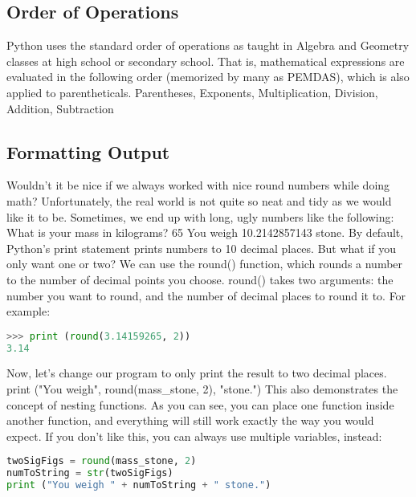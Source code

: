 \subsection{Order of Operations}
 Python uses the standard order of operations as taught in Algebra and Geometry
classes at high school or secondary school. That is, mathematical expressions
are evaluated in the following order (memorized by many as PEMDAS), which is
also applied to parentheticals.
Parentheses, Exponents, Multiplication, Division, Addition, Subtraction

\subsection{Formatting Output}
Wouldn't it be nice if we always worked with nice round numbers while doing
math? Unfortunately, the real world is not quite so neat and tidy as we would
like it to be. Sometimes, we end up with long, ugly numbers like the following:
What is your mass in kilograms? 65
You weigh 10.2142857143 stone.
By default, Python's print statement prints numbers to 10 decimal places. But
what if you only want one or two? We can use the round() function, which rounds
a number to the number of decimal points you choose. round() takes two
arguments: the number you want to round, and the number of decimal places to
round it to. For example:
\lstset{basicstyle=\scriptsize, numbers=left, captionpos=b, tabsize=4}
\begin{lstlisting}[caption=Basic Math 2,language={Python},
xleftmargin=15pt, label=lst:basicmath2]
>>> print (round(3.14159265, 2))
3.14
\end{lstlisting}

Now, let's change our program to only print the result to two decimal places.
print ("You weigh", round(mass\_stone, 2), "stone.")
This also demonstrates the concept of nesting functions. As you can see, you can
place one function inside another function, and everything will still work
exactly the way you would expect. If you don't like this, you can always use
multiple variables, instead:
\lstset{basicstyle=\scriptsize, numbers=left, captionpos=b, tabsize=4}
\begin{lstlisting}[caption=Basic Math 3,language={Python},
xleftmargin=15pt, label=lst:basicmath3]
twoSigFigs = round(mass_stone, 2)
numToString = str(twoSigFigs)
print ("You weigh " + numToString + " stone.")
\end{lstlisting}
